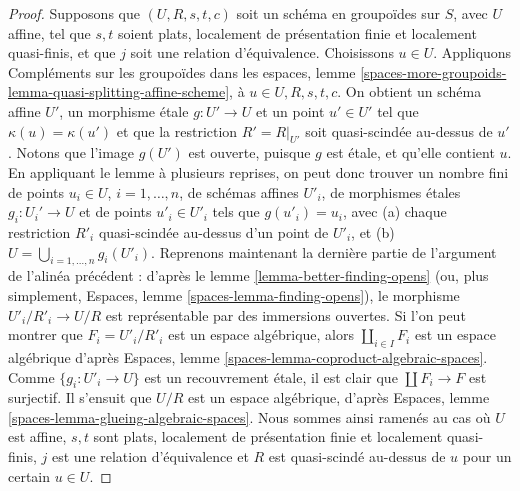 \begin{proof}
\medskip\noindent
Supposons que $(U, R, s, t, c)$ soit un schéma en groupoïdes sur $S$,
avec $U$ affine, tel que $s, t$ soient plats, localement de présentation finie
et localement quasi-finis, et que $j$ soit une relation d'équivalence.
Choisissons $u \in U$. Appliquons
Compléments sur les groupoïdes dans les espaces,
lemme \ref{spaces-more-groupoids-lemma-quasi-splitting-affine-scheme},
à $u \in U, R, s, t, c$. On obtient un schéma affine $U'$, un morphisme étale
$g : U' \to U$ et un point $u' \in U'$ tel que $\kappa(u) = \kappa(u')$
et que la restriction $R' = R|_{U'}$ soit quasi-scindée au-dessus de $u'$.
Notons que l'image $g(U')$ est ouverte, puisque $g$ est étale, et qu'elle contient $u$.
En appliquant le lemme à plusieurs reprises, on peut donc trouver un nombre fini de
points $u_i \in U$, $i = 1, \ldots, n$,
de schémas affines $U'_i$, de morphismes étales $g_i : U_i' \to U$ et de points
$u'_i \in U'_i$ tels que $g(u'_i) = u_i$, avec (a) chaque
restriction $R'_i$ quasi-scindée au-dessus d'un point de $U'_i$, et
(b) $U = \bigcup_{i = 1, \ldots, n} g_i(U'_i)$.
Reprenons maintenant la dernière partie de l'argument de l'alinéa précédent :
d'après le
lemme \ref{lemma-better-finding-opens}
(ou, plus simplement,
Espaces, lemme \ref{spaces-lemma-finding-opens}),
le morphisme $U'_i/R'_i \to U/R$ est représentable par des immersions ouvertes.
Si l'on peut montrer que $F_i = U'_i/R'_i$ est un espace algébrique, alors
$\coprod_{i \in I} F_i$ est un espace algébrique d'après
Espaces, lemme \ref{spaces-lemma-coproduct-algebraic-spaces}.
Comme $\{g_i : U'_i \to U\}$ est un recouvrement étale,
il est clair que $\coprod F_i \to F$ est surjectif. Il s'ensuit que
$U/R$ est un espace algébrique, d'après
Espaces, lemme \ref{spaces-lemma-glueing-algebraic-spaces}.
Nous sommes ainsi ramenés au cas où $U$ est affine, $s, t$ sont plats,
localement de présentation finie et localement quasi-finis,
$j$ est une relation d'équivalence et $R$ est quasi-scindé au-dessus de $u$ pour un certain
$u \in U$.


\end{proof}
